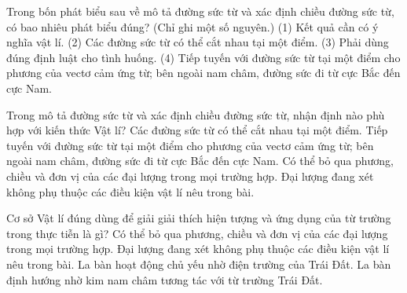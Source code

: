 \begin{ex}
Trong bốn phát biểu sau về mô tả đường sức từ và xác định chiều đường sức từ, có bao nhiêu phát biểu đúng? (Chỉ ghi một số nguyên.) (1) Kết quả cần có ý nghĩa vật lí. (2) Các đường sức từ có thể cắt nhau tại một điểm. (3) Phải dùng đúng định luật cho tình huống. (4) Tiếp tuyến với đường sức từ tại một điểm cho phương của vectơ cảm ứng từ; bên ngoài nam châm, đường sức đi từ cực Bắc đến cực Nam.
\end{ex}

\begin{ex}
Trong mô tả đường sức từ và xác định chiều đường sức từ, nhận định nào phù hợp với kiến thức Vật lí?
\choice
{Các đường sức từ có thể cắt nhau tại một điểm.}
{\True Tiếp tuyến với đường sức từ tại một điểm cho phương của vectơ cảm ứng từ; bên ngoài nam châm, đường sức đi từ cực Bắc đến cực Nam.}
{Có thể bỏ qua phương, chiều và đơn vị của các đại lượng trong mọi trường hợp.}
{Đại lượng đang xét không phụ thuộc các điều kiện vật lí nêu trong bài.}
\end{ex}

\begin{ex}
Cơ sở Vật lí đúng dùng để giải giải thích hiện tượng và ứng dụng của từ trường trong thực tiễn là gì?
\choice
{Có thể bỏ qua phương, chiều và đơn vị của các đại lượng trong mọi trường hợp.}
{Đại lượng đang xét không phụ thuộc các điều kiện vật lí nêu trong bài.}
{La bàn hoạt động chủ yếu nhờ điện trường của Trái Đất.}
{\True La bàn định hướng nhờ kim nam châm tương tác với từ trường Trái Đất.}
\end{ex}

